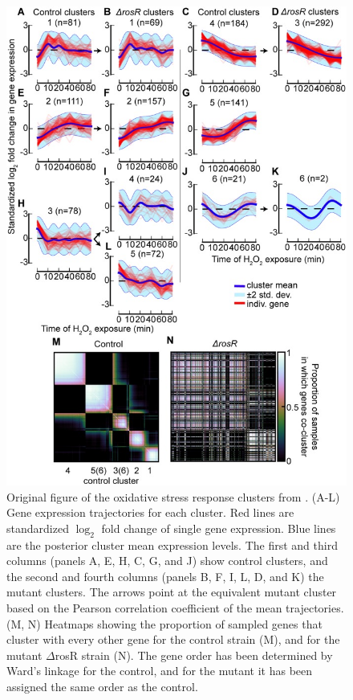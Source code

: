 \begin{figure}[!ht]
    \centering
    \includegraphics[width=.65\textwidth]{../DPGP/papers/pcbi.1005896.g002.jpg}
    \caption[Oxidative stress response clusters from \citeauthor{mcdowellClusteringGeneExpression2018}]{Original figure of the oxidative stress response clusters from \citealp{mcdowellClusteringGeneExpression2018}. (A-L) Gene expression trajectories for each cluster. Red lines are standardized $\log_{2}$ fold change of single gene expression. Blue lines are the posterior cluster mean expression levels. The first and third columns (panels A, E, H, C, G, and J) show control clusters, and the second and fourth columns (panels B, F, I, L, D, and K) the mutant clusters. The arrows point at the equivalent mutant cluster based on the Pearson correlation coefficient of the mean trajectories. (M, N) Heatmaps showing the proportion of sampled genes that cluster with every other gene for the control strain (M), and for the mutant $\Delta$rosR strain (N). The gene order has been determined by Ward's linkage for the control, and for the mutant it has been assigned the same order as the control.}\label{img:paper}
\end{figure}

